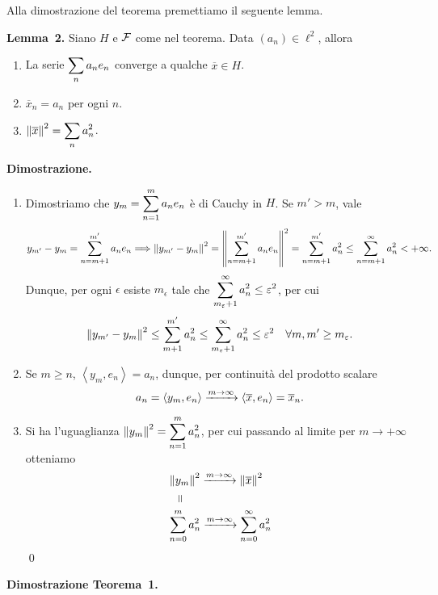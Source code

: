 Alla dimostrazione del teorema premettiamo il seguente lemma.

\vs

\textbf{Lemma~2.} Siano $H$ e $\mathcal{F}$ come nel teorema.
Data $(a_n) \in \ell^2$, allora
\begin{enumerate}
	\item La serie $\displaystyle \sum_n a_n e_n$ converge a qualche $\overline{x} \in H$. 

	\item $\overline{x}_n = a_n$ per ogni $n$.

	\item $\displaystyle \left\lVert \overline{x} \right\rVert^2 = \sum_n a_n^2$.
\end{enumerate}

\textbf{Dimostrazione.}
\begin{enumerate}
\item Dimostriamo che $\displaystyle y_m = \sum_{n = 1}^{m} a_n e_n$ è di Cauchy in $H$.
Se $m' > m$, vale
%
$$
	y_{m'} - y_m = \sum_{n = m+1}^{m'} a_n e_n
	\Longrightarrow  \left\lVert y_{m'} - y_m \right\rVert^2 = \left\lVert \sum_{n = m+1}^{m'} a_n e_n \right\rVert^2 
	= \sum_{n = m+1}^{m'} a_n^2 \leq \sum_{n = m+1}^{\infty} a_n^2 < +\infty.
$$
%
Dunque, per ogni $\epsilon$ esiste $m_\epsilon$ tale che $\displaystyle \sum_{m_\varepsilon + 1}^{\infty} a_n^2 \leq \varepsilon^2 $, per cui 
%
$$
	\left\lVert y_{m'} - y_m \right\rVert^2 \leq \sum_{m+1}^{m'} a_n^2 \leq \sum_{m_\varepsilon + 1}^{\infty} a_n^2 \leq \varepsilon^2 \quad \forall m,m' \geq m_\varepsilon.
$$
%

\item Se $m \geq n$, $\left<y_m, e_n \right> = a_n$, dunque, per continuità del prodotto scalare
%
$$
	a_n = \left<y_m, e_n \right> \xrightarrow{m \to \infty} \left<\overline{x},e_n \right> = \overline{x}_n.
$$
%

\item Si ha l'uguaglianza $\displaystyle \left\lVert y_m \right\rVert^2 = \sum_{n=1}^{m} a_n^2$, per cui passando al limite per $m \to +\infty$ otteniamo 
\begin{align*}
	& \norm{y_m}^2 \xrightarrow{m \to \infty} \norm{\ol{x}}^2 \\
	& \quad \rotatebox[origin=c]{90}{=} \\
	& \sum_{n=0}^{m} a_n^2 \xrightarrow{m \to \infty} \sum_{n=0}^{\infty} a_n^2 
\end{align*}
\qed

\end{enumerate}


\textbf{Dimostrazione Teorema~1.}

